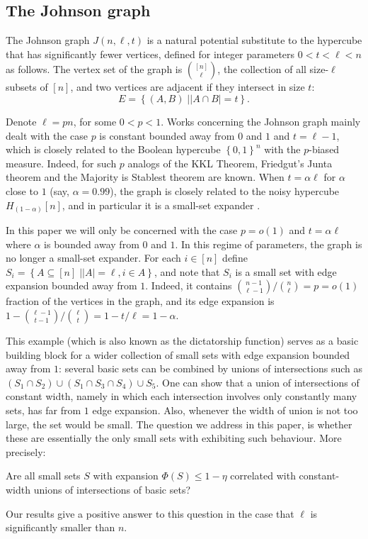 \documentclass{toc}
\newcommand\card[1]{\left| {#1} \right|}
\newcommand\sett[2]{\left\{ \left. #1 \;\right\vert #2 \right\}}
\newcommand\set[1]{{\left\{ #1 \right\}}}
\newcommand\power[1]{\set{0,1}^{#1}}
\renewcommand\leq{\leqslant}
\begin{document}
\subsection{The Johnson graph}
The Johnson graph $J(n,\ell,t)$ %
is a natural potential substitute to the hypercube that has significantly fewer vertices,
defined for integer parameters $0<t<\ell<n$ as follows.
The vertex set of the graph is $\binom{[n]}{\ell}$, the collection of all
%
size-$\ell$   %
subsets of $[n]$,
and two vertices are %
adjacent  %
if they intersect in size $t$:
\[
  E = \sett{(A,B)}{\card{A\cap B} = t}.
\]

Denote $\ell = p n$, for some $0<p<1$. Works concerning the Johnson graph \cite{Wimmer14,F16a,F16b,FKMW16,FM16}
mainly dealt with the case $p$ is constant bounded away from $0$ %
and $1$ and $t=\ell-1$, which is closely related
to the Boolean hypercube $\power{n}$ with the $p$-biased measure. Indeed, for such $p$
analogs of the KKL Theorem, Friedgut's Junta theorem and the Majority is Stablest theorem are known. %
When $t=\alpha\ell$ for $\alpha$ close to $1$ (say, $\alpha = 0.99$), the graph is closely related to the noisy hypercube
$H_{(1-\alpha)}[n]$, and in particular it is a small-set expander \cite{LY}.

In this paper we will only be concerned with the case $p = o(1)$ and $t = \alpha\ell$ where $\alpha$ is bounded away from $0$ and $1$.
In this regime of parameters, the graph is no longer a small-set expander. For each $i\in [n]$ define
$S_i = \sett{A\subseteq[n]}{\card{A} = \ell, i\in A}$, and note that $S_i$ is a small set with edge expansion bounded away from
$1$. Indeed, it
contains ${n-1 \choose \ell-1}/{n \choose \ell} = p = o(1)$ fraction of the vertices in the graph, and its edge expansion is
$1 - {\ell - 1 \choose t-1}/{\ell \choose t} = 1 - t/\ell = 1-\alpha$.

This example (which is also known as the dictatorship function) serves as a basic building block for a wider collection of small sets with edge
expansion bounded away from $1$: several basic sets can be combined by unions of intersections such as $(S_1\cap S_2)\cup (S_1\cap S_3\cap S_4)\cup S_5$.
One can show that a union of intersections of constant width, namely in which each intersection involves only constantly many sets,
has far from $1$ edge expansion. Also, whenever the width of union is not too large, the set would be small.
The question we address in this paper, is whether these are essentially the only small sets with exhibiting such behaviour. More precisely:
\begin{question}\label{question:main}
  Are all small sets $S$ with expansion $\Phi(S)\leq 1-\eta$ correlated with constant-width unions of intersections of basic sets?
\end{question}
Our results give a positive answer to %
this  %
question in the case that $\ell$ is significantly smaller than $n$.
\end{document}
